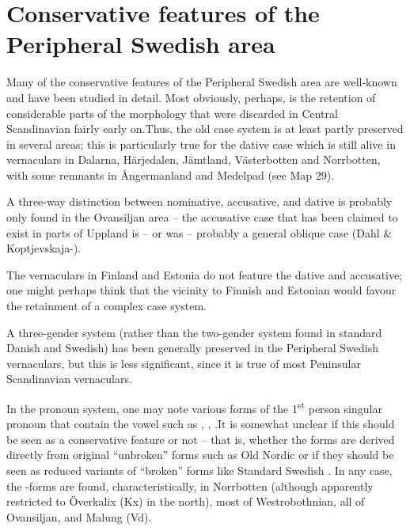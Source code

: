 \section{Conservative features of the Peripheral Swedish area}

Many of the conservative features of the Peripheral Swedish area are well-known and have been studied in detail. Most obviously, perhaps, is the retention of considerable parts of the morphology that were discarded in Central Scandinavian fairly early on.Thus, the old case system is at least partly preserved in several areas; this is particularly true for the dative case which is still alive in vernaculars in Dalarna, Härjedalen, Jämtland, Västerbotten and Norrbotten, with some remnants in Ångermanland and Medelpad (see Map 29). 


A three-way distinction between nominative, accusative, and dative is probably only found in the Ovansiljan area – the accusative case that has been claimed to exist in parts of Uppland is – or was – probably a general oblique case (Dahl \& Koptjevskaja-\citet{Tamm2006}). 


The vernaculars in Finland and Estonia do not feature the dative and accusative; one might perhaps think that the vicinity to Finnish and Estonian would favour the retainment of a complex case system. 


A three-gender system (rather than the two-gender system found in standard Danish and Swedish) has been generally preserved in the Peripheral Swedish vernaculars, but this is less significant, since it is true of most Peninsular Scandinavian vernaculars. 


In the pronoun system, one may note various forms of the 1\textsuperscript{st} person singular pronoun that contain the vowel such as , , .\textstyleLinguisticExample{ }It is somewhat unclear if this should be seen as a conservative feature or not – that is, whether the forms are derived directly from original “unbroken” forms such as Old Nordic or if they should be seen as reduced variants of “broken” forms like Standard Swedish . In any case, the -forms are found, characteristically, in Norrbotten (although apparently restricted to Överkalix (Kx) in the north), most of Westrobothnian, all of Ovansiljan, and Malung (Vd). 

